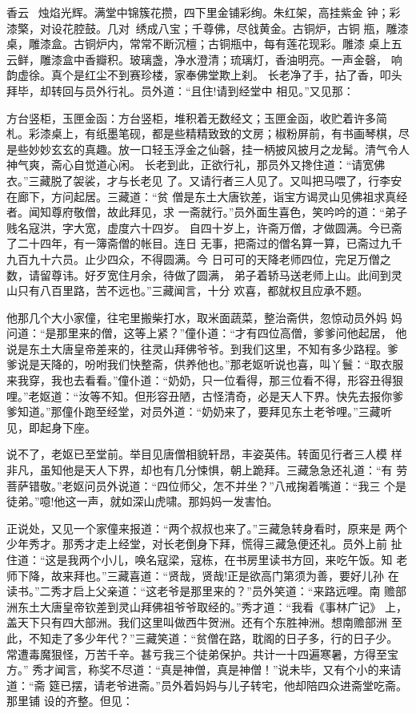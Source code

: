 香云，烛焰光辉。满堂中锦簇花攒，四下里金铺彩绚。朱红架，高挂紫金
钟；彩漆檠，对设花腔鼓。几对，绣成八宝；千尊佛，尽戗黄金。古铜炉，古铜
瓶，雕漆桌，雕漆盒。古铜炉内，常常不断沉檀；古铜瓶中，每有莲花现彩。雕漆
桌上五云鲜，雕漆盒中香瓣积。玻璃盏，净水澄清；琉璃灯，香油明亮。一声金磬，
响韵虚徐。真个是红尘不到赛珍楼，家奉佛堂欺上刹。
长老净了手，拈了香，叩头拜毕，却转回与员外行礼。员外道：“且住!请到经堂中
相见。”又见那：

方台竖柜，玉匣金函：方台竖柜，堆积着无数经文；玉匣金函，收贮着许多简
札。彩漆桌上，有纸墨笔砚，都是些精精致致的文房；椒粉屏前，有书画琴棋，尽
是些妙妙玄玄的真趣。放一口轻玉浮金之仙磬，挂一柄披风披月之龙髯。清气令人
神气爽，斋心自觉道心闲。
长老到此，正欲行礼，那员外又搀住道：“请宽佛衣。”三藏脱了袈裟，才与长老见
了。又请行者三人见了。又叫把马喂了，行李安在廊下，方问起居。三藏道：“贫
僧是东土大唐钦差，诣宝方谒灵山见佛祖求真经者。闻知尊府敬僧，故此拜见，求
一斋就行。”员外面生喜色，笑吟吟的道：“弟子贱名寇洪，字大宽，虚度六十四岁。
自四十岁上，许斋万僧，才做圆满。今已斋了二十四年，有一簿斋僧的帐目。连日
无事，把斋过的僧名算一算，已斋过九千九百九十六员。止少四众，不得圆满。今
日可可的天降老师四位，完足万僧之数，请留尊讳。好歹宽住月余，待做了圆满，
弟子着轿马送老师上山。此间到灵山只有八百里路，苦不远也。”三藏闻言，十分
欢喜，都就权且应承不题。

他那几个大小家僮，往宅里搬柴打水，取米面蔬菜，整治斋供，忽惊动员外妈
妈问道：“是那里来的僧，这等上紧？”僮仆道：“才有四位高僧，爹爹问他起居，
他说是东土大唐皇帝差来的，往灵山拜佛爷爷。到我们这里，不知有多少路程。爹
爹说是天降的，吩咐我们快整斋，供养他也。”那老妪听说也喜，叫丫鬟：“取衣服
来我穿，我也去看看。”僮仆道：“奶奶，只一位看得，那三位看不得，形容丑得狠
哩。”老妪道：“汝等不知。但形容丑陋，古怪清奇，必是天人下界。快先去报你爹
爹知道。”那僮仆跑至经堂，对员外道：“奶奶来了，要拜见东土老爷哩。”三藏听
见，即起身下座。

说不了，老妪已至堂前。举目见唐僧相貌轩昂，丰姿英伟。转面见行者三人模
样非凡，虽知他是天人下界，却也有几分悚惧，朝上跪拜。三藏急急还礼道：“有
劳菩萨错敬。”老妪问员外说道：“四位师父，怎不并坐？”八戒掬着嘴道：“我三
个是徒弟。”噫!他这一声，就如深山虎啸。那妈妈一发害怕。

正说处，又见一个家僮来报道：“两个叔叔也来了。”三藏急转身看时，原来是
两个少年秀才。那秀才走上经堂，对长老倒身下拜，慌得三藏急便还礼。员外上前
扯住道：“这是我两个小儿，唤名寇梁，寇栋，在书房里读书方回，来吃午饭。知
老师下降，故来拜也。”三藏喜道：“贤哉，贤哉!正是欲高门第须为善，要好儿孙
在读书。”二秀才启上父亲道：“这老爷是那里来的？”员外笑道：“来路远哩。南
赡部洲东土大唐皇帝钦差到灵山拜佛祖爷爷取经的。”秀才道：“我看《事林广记》
上，盖天下只有四大部洲。我们这里叫做西牛贺洲。还有个东胜神洲。想南赡部洲
至此，不知走了多少年代？”三藏笑道：“贫僧在路，耽阁的日子多，行的日子少。
常遭毒魔狠怪，万苦千辛。甚亏我三个徒弟保护。共计一十四遍寒暑，方得至宝方。”
秀才闻言，称奖不尽道：“真是神僧，真是神僧！”说未毕，又有个小的来请道：“斋
筵已摆，请老爷进斋。”员外着妈妈与儿子转宅，他却陪四众进斋堂吃斋。那里铺
设的齐整。但见：

